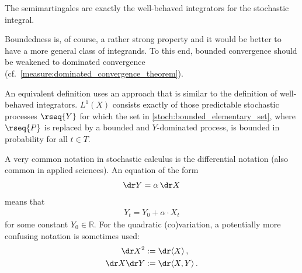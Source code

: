     \begin{theorem}
        The semimartingales are exactly the well-behaved integrators for the stochastic integral.
    \end{theorem}

    Boundedness is, of course, a rather strong property and it would be better to have a more general class of integrands. To this end, bounded convergence should be weakened to dominated convergence (cf.~\cref{measure:dominated_convergence_theorem}).
    \begin{remark}
        An equivalent definition uses an approach that is similar to the definition of well-behaved integrators. $L^1(X)$ consists exactly of those predictable stochastic processes $\rseq{Y}$ for which the set in \cref{stoch:bounded_elementary_set}, where $\rseq{P}$ is replaced by a bounded and $Y$-dominated process, is bounded in probability for all $t\in T$.
    \end{remark}

    \begin{notation}[Differential]
        A very common notation in stochastic calculus is the differential notation (also common in applied sciences). An equation of the form
        \begin{gather}
            \dr Y = \alpha\,\dr X
        \end{gather}
        means that
        \begin{gather}
            Y_t = Y_0 + \alpha\cdot X_t
        \end{gather}
        for some constant $Y_0\in\mathbb{R}$. For the quadratic (co)variation, a potentially more confusing notation is sometimes used:
        \begin{gather}
            \begin{aligned}
                \dr X^2 &:= \dr\langle X \rangle\,,\\
                \dr X\dr Y &:= \dr\langle X,Y \rangle\,.
            \end{aligned}
        \end{gather}
    \end{notation}

